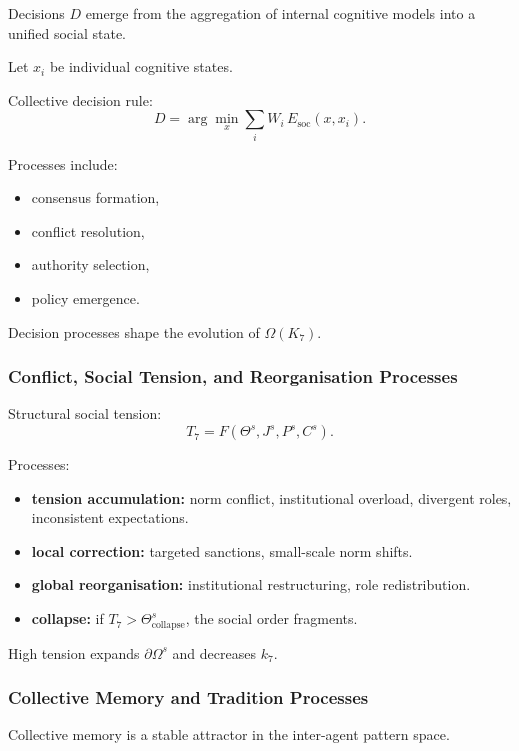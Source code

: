 Decisions $D$ emerge from the aggregation of internal cognitive
models into a unified social state.

Let $x_i$ be individual cognitive states.

Collective decision rule:
\[
D = \arg\min_{x} \sum_i W_i \, E_{\text{soc}}(x, x_i).
\]

Processes include:
\begin{itemize}
    \item consensus formation,
    \item conflict resolution,
    \item authority selection,
    \item policy emergence.
\end{itemize}

Decision processes shape the evolution of $\Omega(K_7)$.

\subsubsection{Conflict, Social Tension, and Reorganisation Processes}

Structural social tension:
\[
T_7 = F(\Theta^s, J^s, P^s, C^s).
\]

Processes:
\begin{itemize}
    \item \textbf{tension accumulation:}
    norm conflict, institutional overload, divergent roles,
    inconsistent expectations.
    \item \textbf{local correction:}
    targeted sanctions, small-scale norm shifts.
    \item \textbf{global reorganisation:}
    institutional restructuring, role redistribution.
    \item \textbf{collapse:}
    if $T_7 > \Theta^s_{\text{collapse}}$, the social order fragments.
\end{itemize}

High tension expands $\partial\Omega^s$ and decreases $k_7$.

\subsubsection{Collective Memory and Tradition Processes}

Collective memory is a stable attractor in the inter-agent pattern
space.

